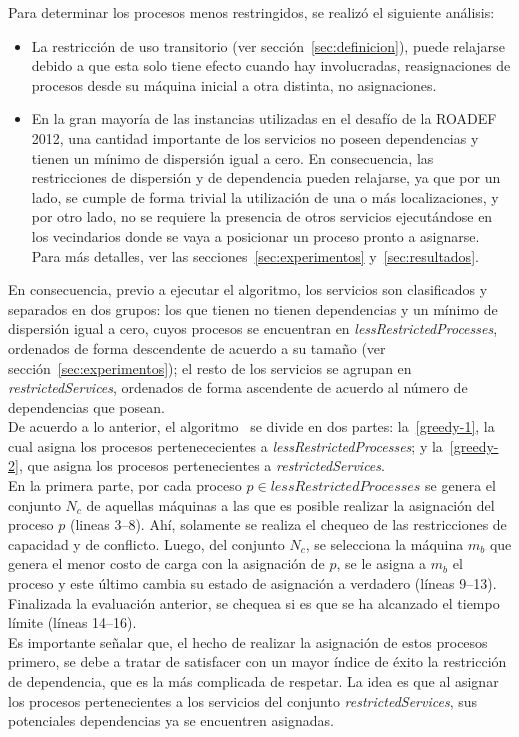 \documentclass[../informe2.tex]{subfiles}
\begin{document}
Para determinar los procesos menos restringidos, se realizó el siguiente análisis:
\begin{itemize}
	\item La restricción de uso transitorio (ver sección~\ref{sec:definicion}), puede relajarse debido a que esta solo tiene efecto cuando hay involucradas, reasignaciones de procesos desde su máquina inicial a otra distinta, no asignaciones.
	\item En la gran mayoría de las instancias utilizadas en el desafío de la ROADEF 2012, una cantidad importante de los servicios no poseen dependencias y tienen un mínimo de dispersión igual a cero. En consecuencia, las restricciones de dispersión y de dependencia pueden relajarse, ya que por un lado, se cumple de forma trivial la utilización de una o más localizaciones, y por otro lado, no se requiere la presencia de otros servicios ejecutándose en los vecindarios donde se vaya a posicionar un proceso pronto a asignarse. Para más detalles, ver las secciones~\ref{sec:experimentos} y~\ref{sec:resultados}.
\end{itemize}
En consecuencia, previo a ejecutar el algoritmo, los servicios son clasificados y separados en dos grupos: los que tienen no tienen dependencias y un mínimo de dispersión igual a cero, cuyos procesos se encuentran en \textit{lessRestrictedProcesses}, ordenados de forma descendente de acuerdo a su tamaño (ver sección~\ref{sec:experimentos}); el resto de los servicios se agrupan en \textit{restrictedServices}, ordenados de forma ascendente de acuerdo al número de dependencias que posean. \\
De acuerdo a lo anterior, el algoritmo \greedy\ se divide en dos partes: la~\ref{greedy-1}, la cual asigna los procesos pertenececientes a \textit{lessRestrictedProcesses}; y la~\ref{greedy-2}, que asigna los procesos pertenecientes a \textit{restrictedServices}.\\

En la primera parte, por cada proceso $p \in lessRestrictedProcesses$ se genera el conjunto $N_c$ de aquellas máquinas a las que es posible realizar la asignación del proceso $p$ (lineas 3--8). Ahí, solamente se realiza el chequeo de las restricciones de capacidad y de conflicto. Luego, del conjunto $N_c$, se selecciona la máquina $m_b$ que genera el menor costo de carga con la asignación de $p$, se le asigna a $m_b$ el proceso y este último cambia su estado de asignación a verdadero (líneas 9--13). Finalizada la evaluación anterior, se chequea si es que se ha alcanzado el tiempo límite (líneas 14--16).\\
Es importante señalar que, el hecho de realizar la asignación de estos procesos primero, se debe a tratar de satisfacer con un mayor índice de éxito la restricción de dependencia, que es la más complicada de respetar. La idea es que al asignar los procesos pertenecientes a los servicios del conjunto \textit{restrictedServices}, sus potenciales dependencias ya se encuentren asignadas.
\end{document}
